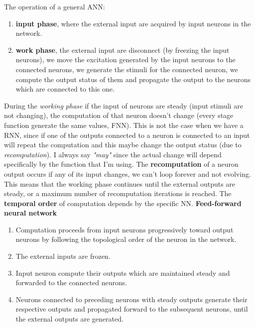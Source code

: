 \documentclass{article}
\begin{document}
\noindent
The operation of a general ANN:
\begin{enumerate}
    \item \textbf{input phase}, where the external input are acquired by
          input neurons in the network.

    \item \textbf{work phase}, the external input are disconnect (by freezing
          the input neurons), we move the excitation generated by the input neurons
          to the connected neurons, we generate the stimuli for the connected neuron,
          we compute the output status of them and propagate the output to the
          neurons which are connected to this one.
\end{enumerate}
During the \textit{working phase} if the input of neurons are steady (input stimuli
are not changing), the computation of that neuron doesn't change (every stage
function generate the same values, FNN).
\newline\newline
This is not the case when we have a RNN, since if one of the outputs connected to
a neuron is connected to an input will repeat the computation and this maybe change
the output status (due to \textit{recomputation}). I always say \textit{"may"}
since the actual change will depend specifically by the function that I'm using.
\newline\newline
The \textbf{recomputation} of a neuron output occurs if any of its input changes,
we can't loop forever and not evolving. This means that the working phase continues
until the external outputs are steady, or a maximum number of
recomputation iterations is reached. The \textbf{temporal order} of computation
depends by the specific NN.
\newline\newline
\noindent\textbf{Feed-forward neural network}
\begin{enumerate}
    \item Computation proceeds from input neurons progressively toward output neurons by following
          the topological order of the neuron in the network.
    \item The external inputs are frozen.
    \item Input neuron compute their outputs which are maintained steady and forwarded
          to the connected neurons.
    \item Neurons connected to preceding neurons with steady outputs generate their
          respective outputs and propagated forward to the subsequent neurons, until the
          external outputs are generated.
\end{enumerate}
\end{document}
